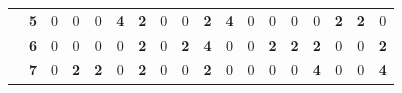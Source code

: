 \documentclass[letterpaper,12pt]{article}
\begin{document}
\begin{table}[h]
\begin{tabular}{|cc|cccccccccccccccc|}
                                                                                                                                                                                                                                                            & \textbf{5} & 0                                      & 0                                              & 0                                              & \textbf{4}                                     & \textbf{2}                                     & 0                                              & 0                                              & \textbf{2}                                     & \textbf{4}                                     & 0                                              & 0                                              & 0                                              & 0                                              & \textbf{2}                                     & \textbf{2}                                     & 0                                               \\
                                                                                                                                                                                                                                                            & \textbf{6} & {\cellcolor[rgb]{0.902,0.902,0.902}}0  & {\cellcolor[rgb]{0.902,0.902,0.902}}0          & {\cellcolor[rgb]{0.902,0.902,0.902}}0          & {\cellcolor[rgb]{0.902,0.902,0.902}}0          & {\cellcolor[rgb]{0.902,0.902,0.902}}\textbf{2} & {\cellcolor[rgb]{0.902,0.902,0.902}}0          & {\cellcolor[rgb]{0.902,0.902,0.902}}\textbf{2} & {\cellcolor[rgb]{0.902,0.902,0.902}}\textbf{4} & {\cellcolor[rgb]{0.902,0.902,0.902}}0          & {\cellcolor[rgb]{0.902,0.902,0.902}}0          & {\cellcolor[rgb]{0.902,0.902,0.902}}\textbf{2} & {\cellcolor[rgb]{0.902,0.902,0.902}}\textbf{2} & {\cellcolor[rgb]{0.902,0.902,0.902}}\textbf{2} & {\cellcolor[rgb]{0.902,0.902,0.902}}0          & {\cellcolor[rgb]{0.902,0.902,0.902}}0          & {\cellcolor[rgb]{0.902,0.902,0.902}}\textbf{2}  \\
                                                                                                                                                                                                                                                            & \textbf{7} & 0                                      & \textbf{2}                                     & \textbf{2}                                     & 0                                              & \textbf{2}                                     & 0                                              & 0                                              & \textbf{2}                                     & 0                                              & 0                                              & 0                                              & 0                                              & \textbf{4}                                     & 0                                              & 0                                              & \textbf{4}                                      \\

\end{tabular}
\end{table}
\end{document}
